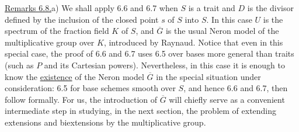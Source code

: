 
\medskip
\noindent\underline{Remarks 6.8.}\quad a) We shall apply 6.6 and 6.7 when
$S$ is a trait and $D$ is the divisor defined by the inclusion of the closed
point $s$ of $S$ into $S$.  In this case $U$ is the spectrum of the fraction
field $K$ of $S$, and $\overline G$ is the usual Neron model of the
multiplicative group over $K$, introduced by Raynaud.  Notice that even in
this special case, the proof of 6.6 and 6.7 uses 6.5 over bases more general
than traits (such as $P$ and its Cartesian powers).  Nevertheless, in this
case it is enough to know the \underline{existence} of the Neron model
$\overline G$ in the special situation under consideration: 6.5 for base
schemes smooth over $S$, and hence 6.6 and 6.7, then follow formally.  For
us, the introduction of $\overline G$ will chiefly serve as a convenient
intermediate step in studying, in the next section, the problem of extending
extensions and biextensions by the multiplicative group.

